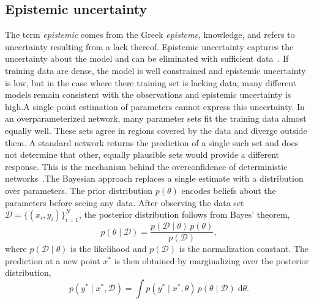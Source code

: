 \subsection{Epistemic uncertainty}
\label{subsec:epistemic}

The term \emph{epistemic} comes from the Greek \emph{episteme}, knowledge, and refers to uncertainty resulting from a lack thereof. Epistemic uncertainty captures the uncertainty about the model and can be eliminated with sufficient data~\cite{kendall2017}. If training data are dense, the model is well constrained and epistemic uncertainty is low, but in the case where there training set is lacking data, many different models remain consistent with the observations and epistemic uncertainty is high.A single point estimation of parameters cannot express this uncertainty. In an overparameterized network, many parameter sets fit the training data almost equally well. These sets agree in regions covered by the data and diverge outside them. A standard network returns the prediction of a single such set and does not determine that other, equally plausible sets would provide a different response. This is the mechanism behind the overconfidence of deterministic networks~\cite{he2025}.The Bayesian approach replaces a single estimate with a distribution over parameters. The prior distribution $p(\theta)$ encodes beliefs about the parameters before seeing any data. After observing the data set $\mathcal{D} = \{(x_i, y_i)\}_{i=1}^{N}$, the posterior distribution follows from Bayes' theorem,
%
\begin{equation}
    p(\theta \mid \mathcal{D})
    = \frac{p(\mathcal{D} \mid \theta)\, p(\theta)}{p(\mathcal{D})} ,
    \label{eq:bayes}
\end{equation}
%
where $p(\mathcal{D} \mid \theta)$ is the likelihood and $p(\mathcal{D})$ is the normalization constant. The prediction at a new point $x^\ast$ is then obtained by marginalizing over the posterior distribution,
%
\begin{equation}
    p(y^\ast \mid x^\ast, \mathcal{D})
    = \int p(y^\ast \mid x^\ast, \theta)\,
           p(\theta \mid \mathcal{D})\; \mathrm{d}\theta .
    \label{eq:predictive}
\end{equation}
%
